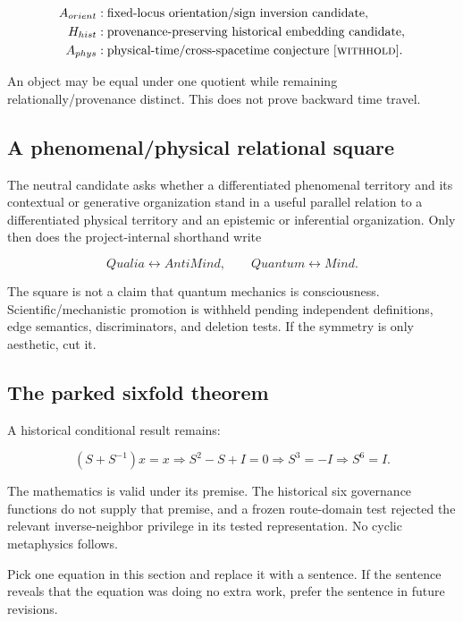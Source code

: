 \documentclass[11pt]{article}
\newcommand{\withhold}{\textsc{withhold}\xspace}
\begin{document}
\begin{align}
A_{orient} &: \text{fixed-locus orientation/sign inversion candidate},\\
H_{hist} &: \text{provenance-preserving historical embedding candidate},\\
A_{phys} &: \text{physical-time/cross-spacetime conjecture }[\withhold].
\end{align}

An object may be equal under one quotient while remaining relationally/provenance distinct. This does not prove backward time travel.

\subsection{A phenomenal/physical relational square}

The neutral candidate asks whether a differentiated phenomenal territory and its contextual or generative organization stand in a useful parallel relation to a differentiated physical territory and an epistemic or inferential organization. Only then does the project-internal shorthand write

\begin{equation}
Qualia\leftrightarrow AntiMind,\qquad Quantum\leftrightarrow Mind.
\end{equation}

The square is not a claim that quantum mechanics is consciousness. Scientific/mechanistic promotion is withheld pending independent definitions, edge semantics, discriminators, and deletion tests. If the symmetry is only aesthetic, cut it.

\subsection{The parked sixfold theorem}

A historical conditional result remains:

\begin{equation}
(S+S^{-1})x=x\Rightarrow S^2-S+I=0\Rightarrow S^3=-I\Rightarrow S^6=I.
\end{equation}

The mathematics is valid under its premise. The historical six governance functions do not supply that premise, and a frozen route-domain test rejected the relevant inverse-neighbor privilege in its tested representation. No cyclic metaphysics follows.

\begin{readercheck}
Pick one equation in this section and replace it with a sentence. If the sentence reveals that the equation was doing no extra work, prefer the sentence in future revisions.
\end{readercheck}
\end{document}
